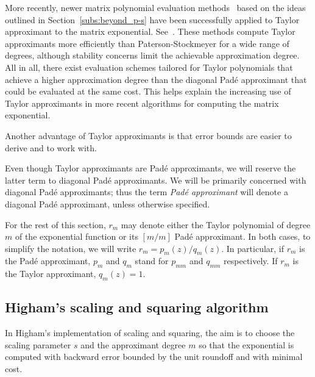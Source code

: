More recently, newer matrix polynomial evaluation methods~\cite{sastre:si21_efficient, sastre:siad25_beyond} based on the ideas outlined in Section~\ref{subs:beyond_p-s} have been successfully applied to Taylor approximant to the matrix exponential. See~\cite{sastre:boosting_19:expm}. These methods compute Taylor approximants more efficiently than Paterson-Stockmeyer for a wide range of degrees, although stability concerns limit the achievable approximation degree. All in all, there exist evaluation schemes tailored for Taylor polynomials that achieve a higher approximation degree than the diagonal Padé approximant that could be evaluated at the same cost. This helps explain the increasing use of Taylor approximants in more recent algorithms for computing the matrix exponential.

Another advantage of Taylor approximants is that error bounds are easier to derive and to work with.

\begin{notazione}\label{notaz:taylor_pade_naming}
	Even though Taylor approximants are Padé approximants, we will reserve the latter term to diagonal Padé approximants. 
	We will be primarily concerned with diagonal Padé approximants; thus the term \emph{Padé approximant} will denote a diagonal Padé approximant, unless otherwise specified.
\end{notazione}
\begin{notazione}\label{notaz:taylor_pade_rm_convention}
	For the rest of this section, $r_m$ may denote either the Taylor polynomial of degree $m$ of the exponential function or its $[m/m]$ Padé approximant. In both cases, to simplify the notation, we will write $r_m= p_m(z)/q_m(z)$. In particular, if $r_m$ is the Padé approximant, $p_m$ and $q_m$ stand for $p_{mm}$ and $q_{mm}$ respectively. If $r_m$ is the Taylor approximant, $q_m(z)=1$. 
\end{notazione}

\subsection{Higham's scaling and squaring algorithm}\label{subs:higham's_sas}
In Higham's implementation of scaling and squaring, the aim is to choose the scaling parameter $s$ and the approximant degree $m$ so that the exponential is computed with backward error bounded by the unit roundoff and with minimal cost.

